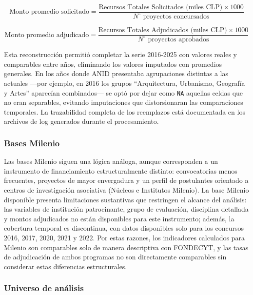 \documentclass[
  12pt,
  letterpaper,
]{article}
\begin{document}
\[\text{Monto promedio solicitado} = \frac{\text{Recursos Totales Solicitados (miles CLP)} \times 1000}{N^{\circ} \text{ proyectos concursados}}\]

\[\text{Monto promedio adjudicado} = \frac{\text{Recursos Totales Adjudicados (miles CLP)} \times 1000}{N^{\circ} \text{ proyectos aprobados}}\]

Esta reconstrucción permitió completar la serie 2016-2025 con valores
reales y comparables entre años, eliminando los valores imputados con
promedios generales. En los años donde ANID presentaba agrupaciones
distintas a las actuales ---por ejemplo, en 2016 los grupos
``Arquitectura, Urbanismo, Geografía y Artes'' aparecían combinados---
se optó por dejar como \texttt{NA} aquellas celdas que no eran
separables, evitando imputaciones que distorsionaran las comparaciones
temporales. La trazabilidad completa de los reemplazos está documentada
en los archivos de log generados durante el procesamiento.

\subsubsection{Bases Milenio}\label{bases-milenio}

Las bases Milenio siguen una lógica análoga, aunque corresponden a un
instrumento de financiamiento estructuralmente distinto: convocatorias
menos frecuentes, proyectos de mayor envergadura y un perfil de
postulantes orientado a centros de investigación asociativa (Núcleos e
Institutos Milenio). La base Milenio disponible presenta limitaciones
sustantivas que restringen el alcance del análisis: las variables de
institución patrocinante, grupo de evaluación, disciplina detallada y
montos adjudicados no están disponibles para este instrumento; además,
la cobertura temporal es discontinua, con datos disponibles solo para
los concursos 2016, 2017, 2020, 2021 y 2022. Por estas razones, los
indicadores calculados para Milenio son comparables solo de manera
descriptiva con FONDECYT, y las tasas de adjudicación de ambos programas
no son directamente comparables sin considerar estas diferencias
estructurales.

\subsubsection{Universo de análisis}\label{universo-de-anuxe1lisis}
\end{document}
